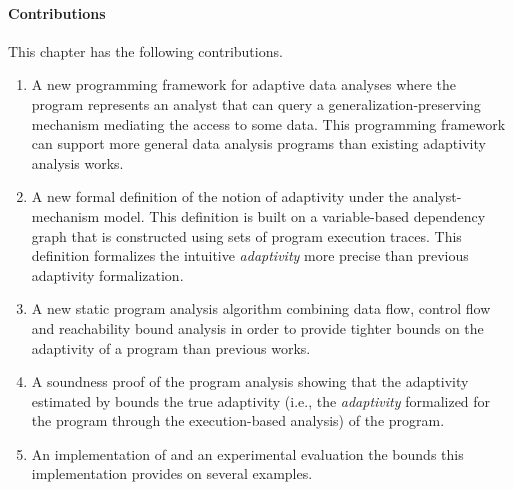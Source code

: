 \paragraph{Contributions}
This chapter has the following contributions.
\begin{enumerate}
   \item A new programming framework for adaptive data analyses
   where the program represents an analyst that can query a generalization-preserving mechanism mediating the access to some data. 
   This programming framework can support more general data analysis programs than existing adaptivity analysis works.
   \item 
   A new formal definition of the notion of adaptivity under the analyst-mechanism model. 
   This definition is built on a variable-based dependency graph that is constructed using sets of program execution traces.
   This definition formalizes the intuitive \emph{adaptivity} more precise than previous adaptivity formalization.
   \item 
   A new static program analysis algorithm {\THESYSTEM} combining data flow,
   control flow and reachability bound analysis in order to provide tighter bounds on the adaptivity of a program than previous works.
   \item A soundness proof of the program analysis showing that the adaptivity estimated by {\THESYSTEM} bounds the true adaptivity
   (i.e., the \emph{adaptivity} formalized for the program through the execution-based analysis) of the program. 
   \item An implementation of {\THESYSTEM} and an experimental evaluation the bounds this implementation provides on several examples.
\end{enumerate}
%

